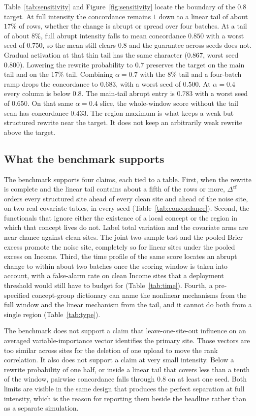 Table~\ref{tab:sensitivity} and Figure~\ref{fig:sensitivity} locate the
boundary of the $0.8$ target.
At full intensity the concordance remains $1$ down to a linear tail of
about $17\%$ of rows, whether the change is abrupt or spread over four
batches.
At a tail of about $8\%$, full abrupt intensity falls to mean concordance
$0.850$ with a worst seed of $0.750$, so the mean still clears $0.8$ and
the guarantee across seeds does not.
Gradual activation at that thin tail has the same character
($0.867$, worst seed $0.800$).
Lowering the rewrite probability to $0.7$ preserves the target on the main
tail and on the $17\%$ tail.
Combining $\alpha=0.7$ with the $8\%$ tail and a four-batch ramp drops the
concordance to $0.683$, with a worst seed of $0.500$.
At $\alpha=0.4$ every column is below $0.8$.
The main-tail abrupt entry is $0.783$ with a worst seed of $0.650$.
On that same $\alpha=0.4$ slice, the whole-window score without the tail
scan has concordance $0.433$.
The region maximum is what keeps a weak but structured rewrite near the
target.
It does not keep an arbitrarily weak rewrite above the target.

\subsection{What the benchmark supports}
\label{sec:support}

The benchmark supports four claims, each tied to a table.
First, when the rewrite is complete and the linear tail contains about a
fifth of the rows or more, $\Delta^{\mathrm{cf}}$ orders every structured
site ahead of every clean site and ahead of the noise site, on two real
covariate tables, in every seed
(Table~\ref{tab:concordance}).
Second, the functionals that ignore either the existence of a local concept
or the region in which that concept lives do not.
Label total variation and the covariate arms are near chance against clean
sites.
The joint two-sample test and the pooled Brier excess promote the noise
site, completely so for linear sites under the pooled excess on Income.
Third, the time profile of the same score locates an abrupt change to
within about two batches once the scoring window is taken into account,
with a false-alarm rate on clean Income sites that a deployment threshold
would still have to budget for
(Table~\ref{tab:time}).
Fourth, a pre-specified concept-group dictionary can name the nonlinear
mechanisms from the full window and the linear mechanism from the tail, and
it cannot do both from a single region
(Table~\ref{tab:type}).

The benchmark does not support a claim that leave-one-site-out influence
on an averaged variable-importance vector identifies the primary site.
Those vectors are too similar across sites for the deletion of one upload
to move the rank correlation.
It also does not support a claim at very small intensity.
Below a rewrite probability of one half, or inside a linear tail that
covers less than a tenth of the window, pairwise concordance falls through
$0.8$ on at least one seed.
Both limits are visible in the same design that produces the perfect
separation at full intensity, which is the reason for reporting them beside
the headline rather than as a separate simulation.
